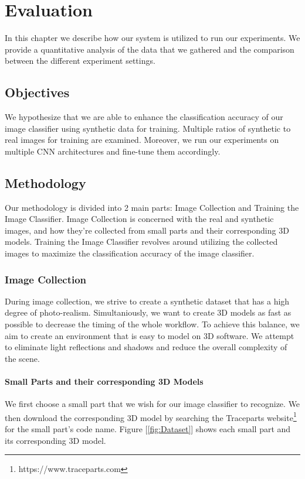 \chapter{Evaluation}

In this chapter we describe how our system is utilized to run our experiments. We provide a quantitative analysis of the data that we gathered and the comparison between the different experiment settings.

\section{Objectives}

We hypothesize that we are able to enhance the classification accuracy of our image classifier using synthetic data for training. Multiple ratios of synthetic to real images for training are examined. Moreover, we run our experiments on multiple CNN architectures and fine-tune them accordingly.


\section{Methodology}

Our methodology is divided into 2 main parts: Image Collection and Training the Image Classifier. Image Collection is concerned with the real and synthetic images, and how they're collected from small parts and their corresponding 3D models. Training the Image Classifier revolves around utilizing the collected images to maximize the classification accuracy of the image classifier.

\subsection{Image Collection}

During image collection, we strive to create a synthetic dataset that has a high degree of photo-realism. Simultaniously, we want to create 3D models as fast as possible to decrease the timing of the whole workflow. To achieve this balance, we aim to create an environment that is easy to model on 3D software. We attempt to eliminate light reflections and shadows and reduce the overall complexity of the scene.

\subsubsection{Small Parts and their corresponding 3D Models}
We first choose a small part that we wish for our image classifier to recognize. We then download the corresponding 3D model by searching the Traceparts website\footnote{https://www.traceparts.com} for the small part's code name. Figure [\ref{fig:Dataset}] shows each small part and its corresponding 3D model. 


